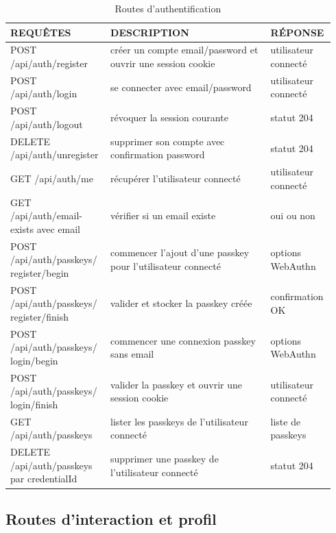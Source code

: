 \documentclass[11pt,a4paper]{article}
\begin{document}
\small
\begin{table}[H]
\centering
\caption{Routes d'authentification}\label{tab:routes_auth}
\begin{tabular}{|>{\raggedright\arraybackslash}m{0.28\linewidth}|>{\raggedright\arraybackslash}m{0.48\linewidth}|>{\raggedright\arraybackslash}m{0.18\linewidth}|}
\hline
\textbf{REQUÊTES} & \textbf{DESCRIPTION} & \textbf{RÉPONSE} \\
\hline
POST /api/auth/register & créer un compte email/password et ouvrir une session cookie & utilisateur connecté \\
\hline
POST /api/auth/login & se connecter avec email/password & utilisateur connecté \\
\hline
POST /api/auth/logout & révoquer la session courante & statut 204 \\
\hline
DELETE /api/auth/unregister & supprimer son compte avec confirmation password & statut 204 \\
\hline
GET /api/auth/me & récupérer l'utilisateur connecté & utilisateur connecté \\
\hline
GET /api/auth/email-exists avec email & vérifier si un email existe & oui ou non \\
\hline
POST /api/auth/passkeys/ register/begin & commencer l'ajout d'une passkey pour l'utilisateur connecté & options WebAuthn \\
\hline
POST /api/auth/passkeys/ register/finish & valider et stocker la passkey créée & confirmation OK \\
\hline
POST /api/auth/passkeys/ login/begin & commencer une connexion passkey sans email & options WebAuthn \\
\hline
POST /api/auth/passkeys/ login/finish & valider la passkey et ouvrir une session cookie & utilisateur connecté \\
\hline
GET /api/auth/passkeys & lister les passkeys de l'utilisateur connecté & liste de passkeys \\
\hline
DELETE /api/auth/passkeys par credentialId & supprimer une passkey de l'utilisateur connecté & statut 204 \\
\hline
\end{tabular}
\end{table}
\normalsize

\subsection{Routes d'interaction et profil}
\end{document}
